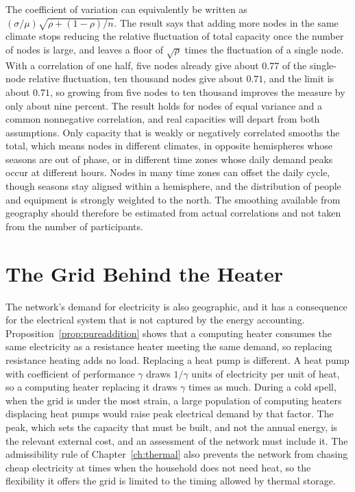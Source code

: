 The coefficient of variation can equivalently be written as $(\sigma/\mu)\sqrt{\rho+(1-\rho)/n}$. The result says that adding more nodes in the same climate stops reducing the relative fluctuation of total capacity once the number of nodes is large, and leaves a floor of $\sqrt\rho$ times the fluctuation of a single node. With a correlation of one half, five nodes already give about $0.77$ of the single-node relative fluctuation, ten thousand nodes give about $0.71$, and the limit is about $0.71$, so growing from five nodes to ten thousand improves the measure by only about nine percent. The result holds for nodes of equal variance and a common nonnegative correlation, and real capacities will depart from both assumptions. Only capacity that is weakly or negatively correlated smooths the total, which means nodes in different climates, in opposite hemispheres whose seasons are out of phase, or in different time zones whose daily demand peaks occur at different hours. Nodes in many time zones can offset the daily cycle, though seasons stay aligned within a hemisphere, and the distribution of people and equipment is strongly weighted to the north. The smoothing available from geography should therefore be estimated from actual correlations and not taken from the number of participants.

\section{The Grid Behind the Heater}

The network's demand for electricity is also geographic, and it has a consequence for the electrical system that is not captured by the energy accounting. Proposition~\ref{prop:pureaddition} shows that a computing heater consumes the same electricity as a resistance heater meeting the same demand, so replacing resistance heating adds no load. Replacing a heat pump is different. A heat pump with coefficient of performance $\gamma$ draws $1/\gamma$ units of electricity per unit of heat, so a computing heater replacing it draws $\gamma$ times as much. During a cold spell, when the grid is under the most strain, a large population of computing heaters displacing heat pumps would raise peak electrical demand by that factor. The peak, which sets the capacity that must be built, and not the annual energy, is the relevant external cost, and an assessment of the network must include it. The admissibility rule of Chapter~\ref{ch:thermal} also prevents the network from chasing cheap electricity at times when the household does not need heat, so the flexibility it offers the grid is limited to the timing allowed by thermal storage.

